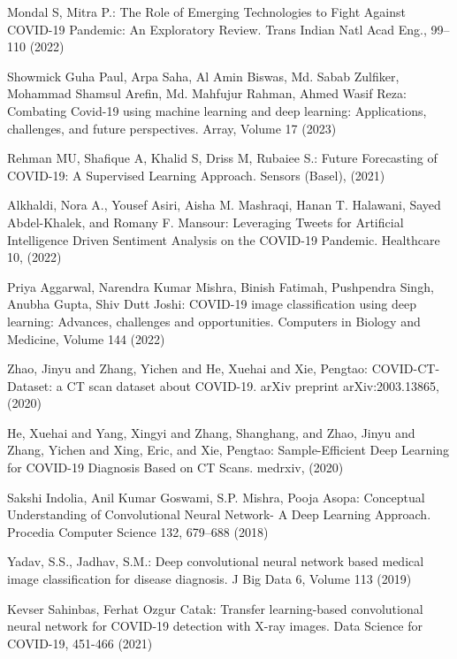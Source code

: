 \begin{thebibliography}{99.}

Mondal S, Mitra P.: The Role of Emerging Technologies to Fight Against COVID-19 Pandemic: An Exploratory Review. Trans Indian Natl Acad Eng., 99--110 (2022)

Showmick Guha Paul, Arpa Saha, Al Amin Biswas, Md. Sabab Zulfiker, Mohammad Shamsul Arefin, Md. Mahfujur Rahman, Ahmed Wasif Reza: Combating Covid-19 using machine learning and deep learning: Applications, challenges, and future perspectives. Array, Volume 17 (2023)

Rehman MU, Shafique A, Khalid S, Driss M, Rubaiee S.: Future Forecasting of COVID-19: A Supervised Learning Approach. Sensors (Basel), (2021)

Alkhaldi, Nora A., Yousef Asiri, Aisha M. Mashraqi, Hanan T. Halawani, Sayed Abdel-Khalek, and Romany F. Mansour: Leveraging Tweets for Artificial Intelligence Driven Sentiment Analysis on the COVID-19 Pandemic. Healthcare 10, (2022)

Priya Aggarwal, Narendra Kumar Mishra, Binish Fatimah, Pushpendra Singh, Anubha Gupta, Shiv Dutt Joshi: COVID-19 image classification using deep learning: Advances, challenges and opportunities. Computers in Biology and Medicine, Volume 144 (2022)

Zhao, Jinyu and Zhang, Yichen and He, Xuehai and Xie, Pengtao: COVID-CT-Dataset: a CT scan dataset about COVID-19. arXiv preprint arXiv:2003.13865, (2020)

He, Xuehai and Yang, Xingyi and Zhang, Shanghang, and Zhao, Jinyu and Zhang, Yichen and Xing, Eric, and Xie, Pengtao: Sample-Efficient Deep Learning for COVID-19 Diagnosis Based on CT Scans. medrxiv, (2020)

Sakshi Indolia, Anil Kumar Goswami, S.P. Mishra, Pooja Asopa: Conceptual Understanding of Convolutional Neural Network- A Deep Learning Approach. Procedia Computer Science 132, 679--688 (2018)

Yadav, S.S., Jadhav, S.M.: Deep convolutional neural network based medical image classification for disease diagnosis. J Big Data 6, Volume 113 (2019)

Kevser Sahinbas, Ferhat Ozgur Catak: Transfer learning-based convolutional neural network for COVID-19 detection with X-ray images. Data Science for COVID-19, 451-466 (2021)


\end{thebibliography}
